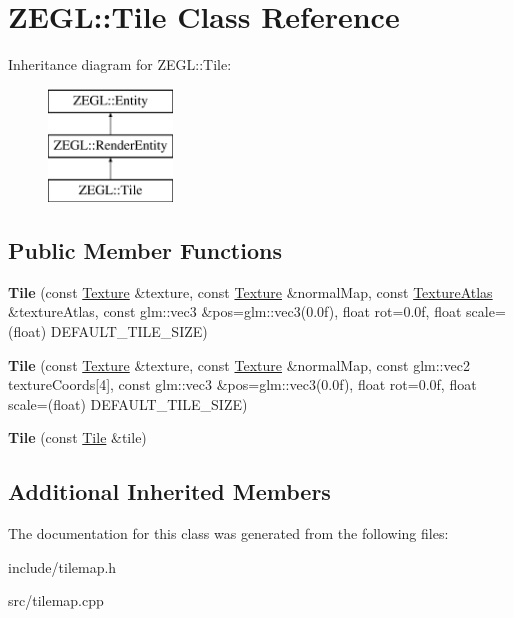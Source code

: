 \hypertarget{class_z_e_g_l_1_1_tile}{}\section{Z\+E\+G\+L\+:\+:Tile Class Reference}
\label{class_z_e_g_l_1_1_tile}
Inheritance diagram for Z\+E\+G\+L\+:\+:Tile\+:\begin{figure}[H]
\begin{center}
\leavevmode
\includegraphics[height=3.000000cm]{class_z_e_g_l_1_1_tile}
\end{center}
\end{figure}
\subsection*{Public Member Functions}
\begin{DoxyCompactItemize}
\item 
\hypertarget{class_z_e_g_l_1_1_tile_a76ae8e0d534409de3973c6d3b4316060}{}{\bfseries Tile} (const \hyperlink{class_z_e_g_l_1_1_texture}{Texture} \&texture, const \hyperlink{class_z_e_g_l_1_1_texture}{Texture} \&normal\+Map, const \hyperlink{class_z_e_g_l_1_1_texture_atlas}{Texture\+Atlas} \&texture\+Atlas, const glm\+::vec3 \&pos=glm\+::vec3(0.\+0f), float rot=0.\+0f, float scale=(float) D\+E\+F\+A\+U\+L\+T\+\_\+\+T\+I\+L\+E\+\_\+\+S\+I\+Z\+E)\label{class_z_e_g_l_1_1_tile_a76ae8e0d534409de3973c6d3b4316060}

\item 
\hypertarget{class_z_e_g_l_1_1_tile_aada416574e744f9bb834e3b13d47a711}{}{\bfseries Tile} (const \hyperlink{class_z_e_g_l_1_1_texture}{Texture} \&texture, const \hyperlink{class_z_e_g_l_1_1_texture}{Texture} \&normal\+Map, const glm\+::vec2 texture\+Coords\mbox{[}4\mbox{]}, const glm\+::vec3 \&pos=glm\+::vec3(0.\+0f), float rot=0.\+0f, float scale=(float) D\+E\+F\+A\+U\+L\+T\+\_\+\+T\+I\+L\+E\+\_\+\+S\+I\+Z\+E)\label{class_z_e_g_l_1_1_tile_aada416574e744f9bb834e3b13d47a711}

\item 
\hypertarget{class_z_e_g_l_1_1_tile_afb482bccc935de5dd1cf7f6f8cdcc7c0}{}{\bfseries Tile} (const \hyperlink{class_z_e_g_l_1_1_tile}{Tile} \&tile)\label{class_z_e_g_l_1_1_tile_afb482bccc935de5dd1cf7f6f8cdcc7c0}

\end{DoxyCompactItemize}
\subsection*{Additional Inherited Members}


The documentation for this class was generated from the following files\+:\begin{DoxyCompactItemize}
\item 
include/tilemap.\+h\item 
src/tilemap.\+cpp\end{DoxyCompactItemize}
